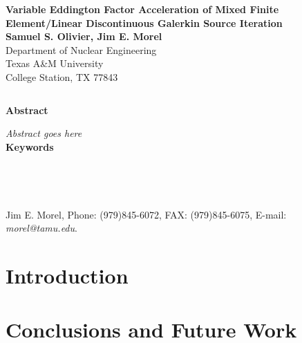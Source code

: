 \documentclass[12pt]{article}
\date{}
\newcommand{\bc}{\begin{center}}
\newcommand{\ec}{\end{center}}
\newcommand{\ess}{\doublespacing}
\begin{document}
%

\thispagestyle{empty}
\bc
{\Large \bf Variable Eddington Factor Acceleration of Mixed Finite Element/Linear Discontinuous Galerkin Source Iteration}\\
\vspace{0.5in}
{\large {\bf Samuel S. Olivier, Jim E. Morel}\\
$ $\\
Department of Nuclear Engineering\\
Texas A\&M University\\
College Station, TX 77843}\\
\ec
$ $\\
\bc
{\large \bf Abstract}\\
\ec
\noindent
\emph{
Abstract goes here
}\\
$ $\\
\noindent
{\bf Keywords}\\
\noindent \\
$ $\\
\\
\noindent \\
$ $\\
\\
\noindent Jim E. Morel, Phone: (979)845-6072, FAX: (979)845-6075, E-mail: \emph{morel@tamu.edu}.
$ $\\
\newpage
\ess

\setcounter{page}{1} %
\section{Introduction}




% 


\section{Conclusions and Future Work}
\end{document}
